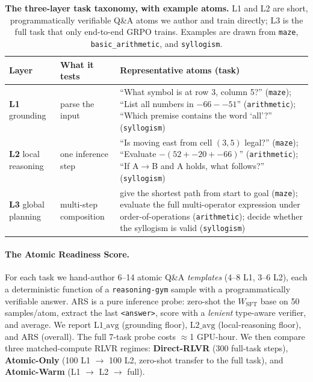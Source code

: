 \documentclass{article}
\newcommand{\Wsft}{W_{\mathrm{SFT}}}
\begin{document}
\begin{table}[t]
\centering\small
\caption{\textbf{The three-layer task taxonomy, with example atoms.} L1 and L2 are short,
programmatically verifiable Q\&A atoms we author and train directly; L3 is the full task that only
end-to-end GRPO trains. Examples are drawn from \texttt{maze}, \texttt{basic\_arithmetic}, and
\texttt{syllogism}.}
\label{tab:taxonomy}
\begin{tabular}{@{}llp{7.4cm}@{}}
\toprule
Layer & What it tests & Representative atoms (task)\\
\midrule
\textbf{L1} grounding & parse the input &
``What symbol is at row 3, column 5?'' (\texttt{maze}); ``List all numbers in $-66 - -51$''
(\texttt{arithmetic}); ``Which premise contains the word `all'?'' (\texttt{syllogism})\\
\addlinespace
\textbf{L2} local reasoning & one inference step &
``Is moving east from cell $(3,5)$ legal?'' (\texttt{maze}); ``Evaluate $-(52 + -20 + -66)$''
(\texttt{arithmetic}); ``If A$\to$B and A holds, what follows?'' (\texttt{syllogism})\\
\addlinespace
\textbf{L3} global planning & multi-step composition &
give the shortest path from start to goal (\texttt{maze}); evaluate the full multi-operator
expression under order-of-operations (\texttt{arithmetic}); decide whether the syllogism is valid
(\texttt{syllogism})\\
\bottomrule
\end{tabular}
\end{table}

\paragraph{The Atomic Readiness Score.} For each task we hand-author 6--14 atomic Q\&A
\emph{templates} (4--8 L1, 3--6 L2), each a deterministic function of a \texttt{reasoning-gym}
sample with a programmatically verifiable answer. ARS is a pure inference probe: zero-shot the
$\Wsft$ base on 50 samples/atom, extract the last \texttt{<answer>}, score with a
\emph{lenient} type-aware verifier, and average. We report $\mathrm{L1\_avg}$ (grounding floor),
$\mathrm{L2\_avg}$ (local-reasoning floor), and $\mathrm{ARS}$ (overall). The full 7-task probe
costs $\approx$1 GPU-hour. We then compare three matched-compute RLVR regimes:
\textbf{Direct-RLVR} (300 full-task steps), \textbf{Atomic-Only} (100 L1 $\rightarrow$ 100 L2,
zero-shot transfer to the full task), and \textbf{Atomic-Warm} (L1 $\rightarrow$ L2 $\rightarrow$
full).
\end{document}

